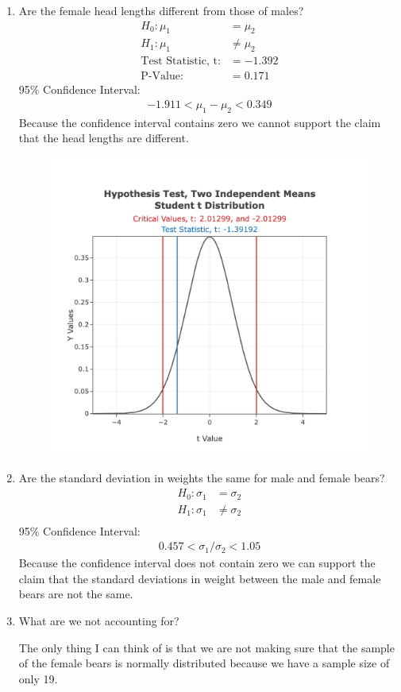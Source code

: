 \documentclass[12pt,fleqn]{article}
\begin{document}
\begin{enumerate}[label=\alph*.]
\item Are the female head lengths different from those of males?
\begin{align*}
  H_0: \mu_1 &= \mu_2 \\
  H_1: \mu_1 &\ne \mu_2 \\
  \text{Test Statistic, t:} &= -1.392 \\
  \text{P-Value:} &= 0.171
\end{align*}
95\% Confidence Interval:
\begin{align*}
  -1.911 < \mu_1 - \mu_2 < 0.349
\end{align*}
Because the confidence interval contains zero we cannot support the claim that the head lengths are different.
\begin{figure}[ht]
  \centering
  \includegraphics[width=12cm]{assets/head-lengths.png}
\end{figure}


\item Are the standard deviation in weights the same for male and female bears?
\begin{align*}
  H_0: \sigma_1 &= \sigma_2 \\
  H_1: \sigma_1 &\ne \sigma_2 \\
\end{align*}
95\% Confidence Interval:
\begin{align*}
  0.457 < \sigma_1/\sigma_2 < 1.05
\end{align*}
Because the confidence interval does not contain zero we can support the claim that the standard deviations in weight between the male and female bears are not the same.


\item What are we not accounting for?

The only thing I can think of is that we are not making sure that the sample of the female bears is normally distributed because we have a sample size of only 19.

\end{enumerate}
\end{document}
